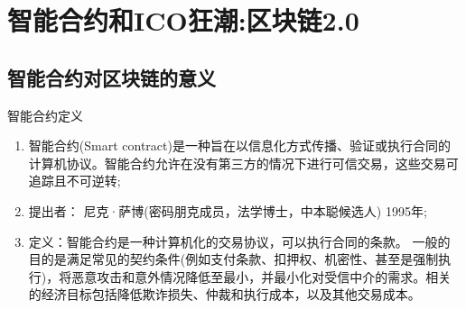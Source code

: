 \documentclass[11pt]{beamer}
\begin{document}
\section{智能合约和ICO狂潮:区块链2.0}
\subsection{智能合约对区块链的意义}
\begin{frame}{智能合约定义}

	\begin{enumerate}
		\item 智能合约(Smart contract)是一种旨在以信息化方式传播、验证或执行合同的计算机协议。智能合约允许在没有第三方的情况下进行可信交易，这些交易可追踪且不可逆转;
		\item 提出者： 尼克·萨博(密码朋克成员，法学博士，中本聪候选人) 1995年;
		\item 定义：智能合约是一种计算机化的交易协议，可以执行合同的条款。
		      {\footnotesize 一般的目的是满足常见的契约条件(例如支付条款、扣押权、机密性、甚至是强制执行)，将恶意攻击和意外情况降低至最小，并最小化对受信中介的需求。相关的经济目标包括降低欺诈损失、仲裁和执行成本，以及其他交易成本。}
	\end{enumerate}

\end{frame}
\end{document}
